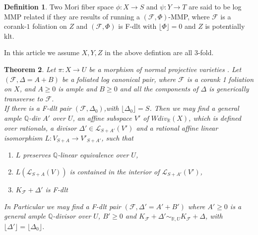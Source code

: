 \documentclass[12pt]{amsart}%
\theoremstyle{plain}
\newtheorem{theorem}{Theorem}[section]
\newtheorem{lemma}[theorem]{Lemma}
\theoremstyle{remark}
\theoremstyle{definition}
\newcommand{\<}{\leq}
\newcommand{\mbQ}{\mathbb{Q}}
\newcommand{\mbR}{\mathbb{R}}
\def\dim{\operatorname{dim}}
\theoremstyle{definition}
\newtheorem{definition}[theorem]{Definition}
\theoremstyle{definition}
\numberwithin{equation}{section}
\theoremstyle{remark}
\begin{document}
\begin{definition}
    Two Mori fiber space $\phi:X\rightarrow S$ and $\psi:Y\rightarrow T$ are said to be log MMP related if they are results of running a $(\mathcal{F},\Phi)$-MMP, where $\mathcal{F}$ is a corank-$1$ foliation on $Z$ and $(\mathcal{F},\Phi)$ is F-dlt with $\lfloor \Phi\rfloor =0$ and $Z$ is potentially klt.
\end{definition}
In this article we assume $X,Y,Z$ in the above defintion are all $3$-fold.

\begin{theorem}\label{CGT1}
    Let $\pi:X\rightarrow U$ be a morphism of normal projective varieties . Let $(\mathcal{F},\Delta=A+B)$ be a foliated log canonical pair, where $\mathcal{F}$ is a corank 1 foliation on $X$, and $A\geqslant 0$ is ample and $B\geqslant 0$ and all the components of $\Delta$ is generically transverse to $\mathcal{F}$.\\
    If  there is a F-dlt pair $(\mathcal{F},\Delta_0)$,with $\lfloor\Delta_0\rfloor=S$. Then we may find a general ample $\mbQ$-div $A'$ over $U$, an affine subspace $V'$ of $Wdiv_{\mbR}(X)$, which is defined over rationals, a divisor $\Delta'\in \mathcal{L}_{S+A'}(V')$ and a rational affine linear isomorphism $L:V_{S+A}\rightarrow V'_{S+A'}$, such that
   \begin{enumerate}
        \item $L$ preserves $\mbQ$-linear equivalence over $U$,
        \item $L(\mathcal{L}_{S+A}(V))$ is contained in the interior of $\mathcal{L}_{S+A'}(V')$,
        \item $K_{\mathcal{F}}+\Delta'$ is F-dlt 
        
    \end{enumerate}
    In Particular we may find a F-dlt pair $(\mathcal{F},\Delta'=A'+B')$ where $A'\geqslant 0$ is a general ample $\mbQ$-divisor over $U$, $B'\geqslant 0$ and $K_{\mathcal{F}}+\Delta'\sim_{\mbR ,U} K_{\mathcal{F}}+\Delta$, with $\lfloor \Delta'\rfloor=\lfloor \Delta_0\rfloor$.
\end{theorem}
\end{document}
